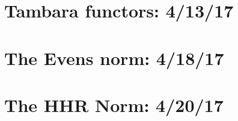 \documentclass{style_EHT}
\begin{document}
\section{Tambara functors: 4/13/17}
	
\section{The Evens norm: 4/18/17}
	
\section{The HHR Norm: 4/20/17}
	

{}

\end{document}
